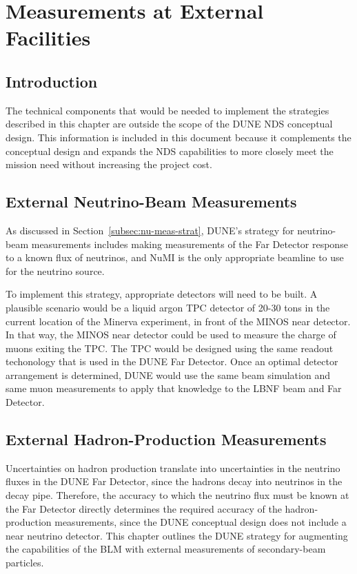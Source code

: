 
\chapter{Measurements at External Facilities}
\label{ch:nd-external-meas}

\section{Introduction}

The technical components that would be needed to implement the strategies 
described in this chapter are outside the scope of the DUNE NDS conceptual 
design. This information is included in this document because it complements the conceptual 
design and expands the NDS capabilities to more closely meet the mission need without increasing the project cost.


\section{External Neutrino-Beam Measurements}
\label{sec:nd-external-beam}

As discussed in Section~\ref{subsec:nu-meas-strat}, DUNE's strategy for neutrino-beam measurements includes making measurements of the Far Detector response to a known flux of neutrinos, and NuMI is the only appropriate beamline to use for the neutrino source.

To implement this strategy, appropriate detectors will need to be built.  A plausible scenario would be a liquid argon TPC detector of 20-30 tons in the current location of the Minerva experiment, in front of the MINOS near detector. In that way, the MINOS near detector could be used to measure the charge of muons exiting the TPC. The TPC would be designed using the same readout techonology that is used in the DUNE Far Detector.  Once an optimal detector arrangement is determined, DUNE would use the same beam simulation and same muon measurements to apply that knowledge to the LBNF beam and Far Detector.

\section{External Hadron-Production Measurements}
\label{sec:nd-external-hadron}

Uncertainties on hadron production translate into uncertainties in the neutrino fluxes in the DUNE Far Detector, since the hadrons decay into neutrinos in the decay pipe.  
Therefore, the accuracy to which the neutrino flux must be known at the Far Detector directly determines the required accuracy 
of the hadron-production measurements, since the DUNE conceptual design does not include a near neutrino detector. This chapter outlines the DUNE strategy for augmenting the capabilities of the BLM with external measurements of secondary-beam particles.  

